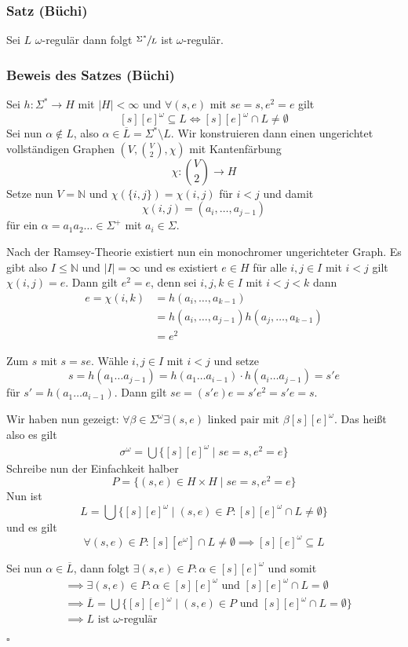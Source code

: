 \documentclass[12pt, german]{article}
\newcommand{\N}{\mathbb{N}}
\newcommand{\sigstern}{\Sigma^\ast}
\newcommand{\pom}{^{\omega}}
\newcommand{\bewiesen}{
	
	\begin{flushright}
		$\square$  \\
\end{flushright}}
\begin{document}
\subsubsection{Satz (Büchi)}
	Sei $L$ $\omega$-regulär dann folgt $\sfrac{\sigstern}{L}$ ist $\omega$-regulär. 
	
\subsubsection{Beweis des Satzes (Büchi)}
	Sei $h:\sigstern \to H$ mit $|H| < \infty$ und $\forall(s,e)$ mit $se=s, e^2 = e$ gilt $$[s][e]\pom \subseteq L \iff [s][e]\pom \cap L \not = \emptyset$$
	Sei nun $\alpha \not \in L$, also $\alpha \in \overline{L} = \sigstern \setminus L$. Wir konstruieren dann einen ungerichtet vollständigen Graphen $(V, \binom{V}{2}, \chi)$ mit Kantenfärbung $$\chi : \binom{V}{2} \to H$$ Setze nun $V = \N$ und $\chi(\{i, j\}) = \chi(i, j)$ für $i <j$ und damit $$\chi(i, j) = (a_i, \ldots, a_{j-1})$$ für ein $\alpha = a_1a_2\ldots \in \Sigma^+$ mit $a_i \in \Sigma$.
	\newline
	
	Nach der  Ramsey-Theorie  existiert nun ein monochromer ungerichteter Graph. Es gibt also $I \leq \N$ und $|I| = \infty$ und es existiert $e \in H$ für alle $i,j \in I$ mit $i < j$ gilt $\chi(i, j) = e$. 
	Dann gilt $e^2 = e$, denn sei $i, j, k \in I$ mit $i < j < k$ dann 
	\begin{align*}
		e = \chi(i, k) &= h(a_i, \ldots, a_{k-1}) \\
		&=h(a_i, \ldots, a_{j-1})h(a_j,\ldots,a_{k-1}) \\
		&=e^2
	\end{align*}
	
	Zum $s$ mit $s = se$. Wähle $i, j \in I$ mit $i < j$ und setze $$s = h(a_1 \ldots a_{j-1}) = h(a_1 \ldots a_{i-1}) \cdot h(a_i \ldots a_{j-1}) = s'e$$ für 
	$s' = h(a_1\ldots a_{i-1})$. Dann gilt $se = (s'e)e = s'e^2 = s'e = s$. 
	
	Wir haben nun gezeigt: $\forall \beta \in \Sigma\pom \exists(s,e) \text{ linked pair mit } \beta[s][e]\pom$. Das hei\ss t also es gilt 
	\begin{align*}
		\sigma\pom = \bigcup \{[s][e]\pom \mid se = s, e^2 = e \}
	\end{align*}
	Schreibe nun der Einfachkeit halber $$P = \{ (s,e) \in H \times H \mid se = s, e^2 = e\}$$
	Nun ist $$L = \bigcup\{[s][e]\pom \mid (s,e)\in P : [s][e]\pom \cap L \not = \emptyset\}$$ und es gilt $$\forall (s,e) \in P: [s][e\pom] \cap L \not = \emptyset \implies [s][e]\pom \subseteq L$$
	\newline
	
	Sei nun $\alpha \in \overline{L}$, dann folgt $\exists (s,e) \in P : \alpha \in [s][e]\pom$ und somit 
	\begin{align*}
		&\implies \exists (s,e) \in P: \alpha \in [s][e]\pom \text{ und } [s][e]\pom \cap L = \emptyset \\
		&\implies \overline{ L } = \bigcup \{[s][e]\pom \mid (s,e )\in P \text{ und } [s][e]\pom \cap L = \emptyset\} \\
		&\implies L \text{ ist $\omega$-regulär}
	\end{align*}
	\bewiesen
\end{document}
